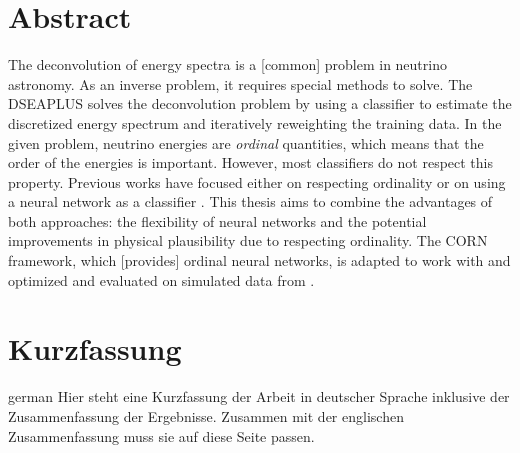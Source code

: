 \thispagestyle{plain}

\section*{Abstract}

The deconvolution of energy spectra is a [common] problem in neutrino astronomy.
As an inverse problem,
  it requires special methods to solve.
The \acf{DSEAPLUS} \cite{dsea_unification}
solves the deconvolution problem
  by using a classifier to estimate the discretized energy spectrum
  and iteratively reweighting the training data.
%
In the given problem,
  neutrino energies are \emph{ordinal} quantities,
    which means that the order of the energies is important. %
However,
  most classifiers do not respect this property.
%
Previous works
have focused either
  on respecting ordinality \cite{dsea_jan}
  or on using a neural network as a classifier \cite{dsea_samuel}.
This thesis aims to combine the advantages of both approaches:
  the flexibility of neural networks
  and the potential improvements in physical plausibility
    due to respecting ordinality.
The \ac{CORN} framework,
  which [provides] ordinal neural networks,
is adapted to work with \dsea{}
and optimized and evaluated on simulated data from \icecube{}.



\section*{Kurzfassung}
\begin{foreignlanguage}{german}
Hier steht eine Kurzfassung der Arbeit in deutscher Sprache inklusive der Zusammenfassung der
Ergebnisse.
Zusammen mit der englischen Zusammenfassung muss sie auf diese Seite passen.

\blindtext[1]
\end{foreignlanguage}
